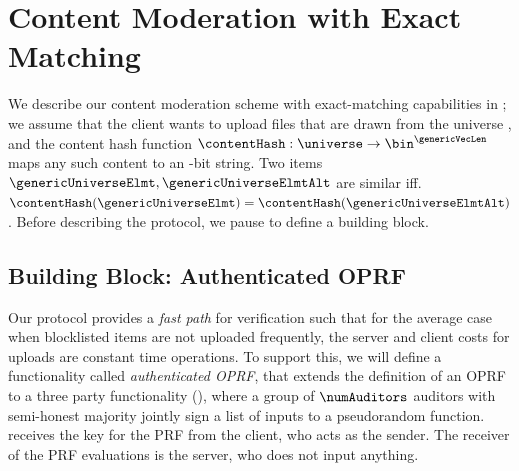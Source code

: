 \section{Content Moderation with Exact Matching}
\label{sec:exact_match}

%


We describe our content moderation scheme with exact-matching capabilities in ; we assume that the client wants to upload files that are drawn from the universe \universe, and the content hash function $\contentHash: \universe \rightarrow \bin^{\genericVecLen}$ maps any such content to an \genericVecLen-bit string. Two items $\genericUniverseElmt, \genericUniverseElmtAlt$ are similar iff. $\contentHash(\genericUniverseElmt) = \contentHash(\genericUniverseElmtAlt)$.  
Before describing the protocol, we pause to define a building block. 

\subsection{Building Block: Authenticated OPRF}
%

Our protocol provides a \emph{fast path} for verification such that for the average case when blocklisted items are not uploaded frequently, the server and client costs for uploads are constant time operations. To support this, we will define a functionality called \emph{authenticated OPRF}, that extends the definition of an OPRF to a three party functionality \authOPRFFunc (), where a group of $\numAuditors$ auditors with semi-honest majority jointly sign a list of inputs to a pseudorandom function. \authOPRFFunc receives the key for the PRF from the client, who acts as the sender. The receiver of the PRF evaluations is the server, who does not input anything.



 


